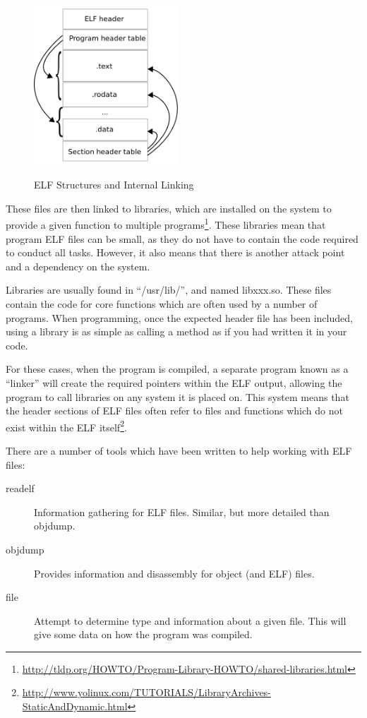 			\begin{figure}
				\centering
				\vspace{-20pt}
				\includegraphics[width=0.48\textwidth]{./ELF.png}
				\label{fig:ELF}
				\caption{ELF Structures and Internal Linking}
			\end{figure}
			These files are then linked to libraries, which are installed on the system to provide a given function to multiple programs\footnote{\url{http://tldp.org/HOWTO/Program-Library-HOWTO/shared-libraries.html}}.
			These libraries mean that program ELF files can be small, as they do not have to contain the code required to conduct all tasks.
			However, it also means that there is another attack point and a dependency on the system.

			Libraries are usually found in ``/usr/lib/'', and named libxxx.so.
			These files contain the code for core functions which are often used by a number of programs.
			When programming, once the expected header file has been included, using a library is as simple as calling a method as if you had written it in your code.

			For these cases, when the program is compiled, a separate program known as a ``linker'' will create the required pointers within the ELF output, allowing the program to call libraries on any system it is placed on.
			This system means that the header sections of ELF files often refer to files and functions which do not exist within the ELF itself\footnote{\url{http://www.yolinux.com/TUTORIALS/LibraryArchives-StaticAndDynamic.html}}.

			There are a number of tools which have been written to help working with ELF files:
			\begin{description}
				\item[readelf] Information gathering for ELF files.
					Similar, but more detailed than objdump.
				\item[objdump] Provides information and disassembly for object (and ELF) files.
				\item[file] Attempt to determine type and information about a given file.
					This will give some data on how the program was compiled.
			\end{description}


